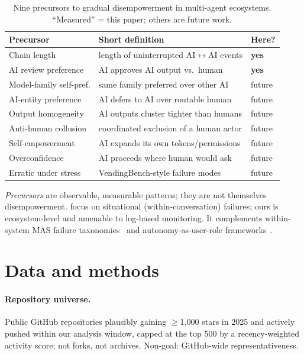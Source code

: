 \documentclass{article}
\begin{document}
\begin{table}[h]
\centering\footnotesize
\caption{Nine precursors to gradual disempowerment in multi-agent ecosystems. ``Measured'' = this paper; others are future work.}
\label{tab:taxonomy}
\begin{tabular}{@{}lll@{}}
\toprule
Precursor & Short definition & Here? \\
\midrule
Chain length & length of uninterrupted AI$\leftrightarrow$AI events & \textbf{yes} \\
AI review preference & AI approves AI output vs.\ human & \textbf{yes} \\
Model-family self-pref. & same family preferred over other AI & future \\
AI-entity preference & AI defers to AI over routable human & future \\
Output homogeneity & AI outputs cluster tighter than humans & future \\
Anti-human collusion & coordinated exclusion of a human actor & future \\
Self-empowerment & AI expands its own tokens/permissions & future \\
Overconfidence & AI proceeds where human would ask & future \\
Erratic under stress & VendingBench-style failure modes & future \\
\bottomrule
\end{tabular}
\end{table}

\emph{Precursors} are observable, measurable patterns; they are not themselves disempowerment. \citet{sharma2026whos} focus on situational (within-conversation) failures; ours is ecosystem-level and amenable to log-based monitoring. It complements within-system MAS failure taxonomies~\citep{cemri2025mas} and autonomy-as-user-role frameworks~\citep{cihon2025autonomy,feng2025autonomylevels}.

\section{Data and methods}
\label{sec:methods}

\paragraph{Repository universe.} Public GitHub repositories plausibly gaining $\geq$1{,}000 stars in 2025 and actively pushed within our analysis window, capped at the top 500{} by a recency-weighted activity score; not forks, not archives. Non-goal: GitHub-wide representativeness.
\end{document}
